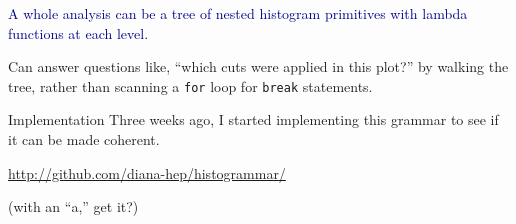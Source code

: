 \documentclass{beamer}
\begin{document}
\begin{frame}{}
\textcolor{darkblue}{\large A whole analysis can be a tree of nested histogram primitives with lambda functions at each level.}

\vfill
{}

\vfill
Can answer questions like, ``which cuts were applied in this plot?'' by walking the tree, rather than scanning a {\tt \small for} loop for {\tt \small break} statements.
\end{frame}

\begin{frame}{Implementation}
Three weeks ago, I started implementing this grammar to see if it can be made coherent.

\begin{center}
\textcolor{blue}{\url{http://github.com/diana-hep/histogrammar/}}
\end{center}

(with an ``a,'' get it?)
\end{frame}
\end{document}
